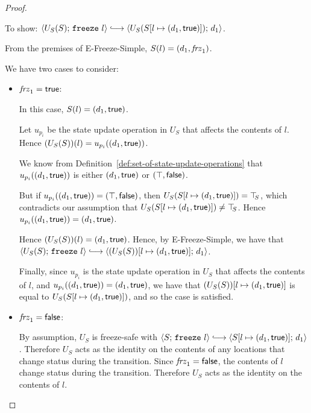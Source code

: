 \begin{proof}
\begin{itemize}
      To show: $\config{U_S(S)}{\freeze{l}} \parstepsto
      \config{U_S(\extS{S}{l}{d_1}{\frozentrue})}{d_1}$.

      From the premises of {\sc E-Freeze-Simple}, $S(l) =
      (d_1, \mathit{frz}_1)$.

      We have two cases to consider:
      \begin{itemize}
        \item $\mathit{frz}_1 = \textsf{true}$:

          In this case, $S(l) = (d_1, \textsf{true})$.

          Let $u_{p_i}$ be the state update operation in $U_S$ that
          affects the contents of $l$.  Hence $(U_S(S))(l) =
          u_{p_i}((d_1, \textsf{true}))$.

          We know from
          Definition~\ref{def:set-of-state-update-operations} that
          $u_{p_i}((d_1, \textsf{true}))$ is either
          $(d_1, \textsf{true})$ or $(\top, \textsf{false})$.

          But if $u_{p_i}((d_1, \textsf{true})) =
          (\top, \textsf{false})$, then
          $U_S(S[l \mapsto (d_1, \textsf{true})]) = \top\hspace{-0.85mm}_{S}$, which
          contradicts our assumption that
          $U_S(S[l \mapsto (d_1, \textsf{true})]) \neq \top\hspace{-0.85mm}_{S}$.  Hence
          $u_{p_i}((d_1, \textsf{true})) =
          (d_1, \textsf{true})$.

          Hence $(U_S(S))(l) = (d_1, \textsf{true})$.  Hence, by
          {\sc E-Freeze-Simple}, we have that
          $\config{U_S(S)}{\freeze{l}} \parstepsto
          \config{\extS{(U_S(S))}{l}{d_1}{\frozentrue}}{d_1}$.

          Finally, since $u_{p_i}$ is the state update operation in
          $U_S$ that affects the contents of $l$, and
          $u_{p_i}((d_1, \textsf{true})) =
          (d_1, \textsf{true})$, we have that
          $(U_S(S))[l \mapsto (d_1, \textsf{true})]$ is equal to
          $U_S(S[l \mapsto (d_1, \textsf{true})])$, and so the case is
          satisfied.

        \item $\mathit{frz}_1 = \textsf{false}$:

          By assumption, $U_S$ is freeze-safe with
          $\config{S}{\freeze{l}} \parstepsto
          \config{\extS{S}{l}{d_1}{\frozentrue}}{d_1}$.  Therefore
          $U_S$ acts as the identity on the contents of any locations
          that change status during the transition.  Since $\mathit{frz}_1
          = \textsf{false}$, the contents of $l$ change status during
          the transition.  Therefore $U_S$ acts as the identity on the
          contents of $l$.


\end{itemize}
\end{itemize}
\end{proof}
